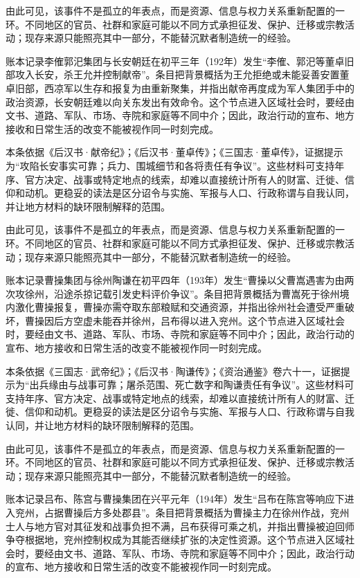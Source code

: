 由此可见，该事件不是孤立的年表点，而是资源、信息与权力关系重新配置的一环。不同地区的官员、社群和家庭可能以不同方式承担征发、保护、迁移或宗教活动；现存来源只能照亮其中一部分，不能替沉默者制造统一的经验。

账本记录李傕郭汜集团与长安朝廷在初平三年（192年）发生“李傕、郭汜等董卓旧部攻入长安，杀王允并控制献帝”。条目把背景概括为王允拒绝或未能妥善安置董卓旧部，西凉军以生存和报复为由重新聚集，并指出献帝再度成为军人集团手中的政治资源，长安朝廷难以向关东发出有效命令。这个节点进入区域社会时，要经由文书、道路、军队、市场、寺院和家庭等不同中介；因此，政治行动的宣布、地方接收和日常生活的改变不能被视作同一时刻完成。

本条依据《后汉书·献帝纪》；《后汉书·董卓传》；《三国志·董卓传》，证据提示为“攻陷长安事实可靠；兵力、围城细节和各将责任有争议”。这些材料可支持年序、官方决定、战事或特定地点的线索，却难以直接统计所有人的财富、迁徙、信仰和动机。更稳妥的读法是区分诏令与实施、军报与人口、行政称谓与自我认同，并让地方材料的缺环限制解释的范围。

由此可见，该事件不是孤立的年表点，而是资源、信息与权力关系重新配置的一环。不同地区的官员、社群和家庭可能以不同方式承担征发、保护、迁移或宗教活动；现存来源只能照亮其中一部分，不能替沉默者制造统一的经验。

账本记录曹操集团与徐州陶谦在初平四年（193年）发生“曹操以父曹嵩遇害为由两次攻徐州，沿途杀掠记载引发史料评价争议”。条目把背景概括为曹嵩死于徐州境内激化曹操报复，曹操亦需夺取东部粮赋和交通资源，并指出徐州社会遭受严重破坏，曹操因后方空虚未能吞并徐州，吕布得以进入兖州。这个节点进入区域社会时，要经由文书、道路、军队、市场、寺院和家庭等不同中介；因此，政治行动的宣布、地方接收和日常生活的改变不能被视作同一时刻完成。

本条依据《三国志·武帝纪》；《后汉书·陶谦传》；《资治通鉴》卷六十一，证据提示为“出兵缘由与战事可靠；屠杀范围、死亡数字和陶谦责任有争议”。这些材料可支持年序、官方决定、战事或特定地点的线索，却难以直接统计所有人的财富、迁徙、信仰和动机。更稳妥的读法是区分诏令与实施、军报与人口、行政称谓与自我认同，并让地方材料的缺环限制解释的范围。

由此可见，该事件不是孤立的年表点，而是资源、信息与权力关系重新配置的一环。不同地区的官员、社群和家庭可能以不同方式承担征发、保护、迁移或宗教活动；现存来源只能照亮其中一部分，不能替沉默者制造统一的经验。

账本记录吕布、陈宫与曹操集团在兴平元年（194年）发生“吕布在陈宫等响应下进入兖州，占据曹操后方多处郡县”。条目把背景概括为曹操主力在徐州作战，兖州士人与地方官对其征发和战事负担不满，吕布获得可乘之机，并指出曹操被迫回师争夺根据地，兖州控制权成为其能否继续扩张的决定性资源。这个节点进入区域社会时，要经由文书、道路、军队、市场、寺院和家庭等不同中介；因此，政治行动的宣布、地方接收和日常生活的改变不能被视作同一时刻完成。

